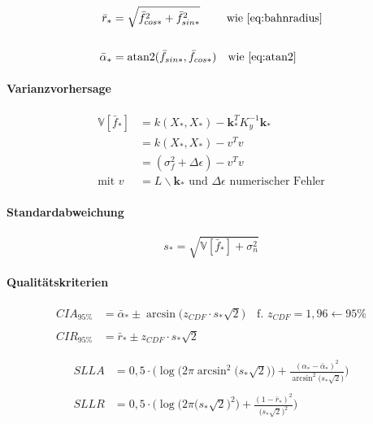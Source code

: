 \begin{align}\label{eq:predangrad}
	\bar{r}_* &= \sqrt{\bar{f}_{cos*}^2 + \bar{f}_{sin*}^2} \quad\quad\ \text{wie \autoref{eq:bahnradius}} \nonumber \\
	\\
	\bar{\alpha}_* &= \text{atan2}(\bar{f}_{sin*}, \bar{f}_{cos*}) \quad \text{wie \autoref{eq:atan2}} \nonumber
\end{align}



\paragraph*{Varianzvorhersage}


\begin{align}\label{eq:predvar}
	\mathbb{V}\left[ \bar{f}_* \right] &= k(X_*, X_*) - \mathbf{k}_*^T K_y^{-1} \mathbf{k}_* \nonumber \\
									   &= k(X_*, X_*) - v^T v \\
									   &= (\sigma_f^2 + \Delta\epsilon) - v^T v \nonumber \\
						 \text{mit } v &= L \backslash \mathbf{k}_* \text{ und } \Delta\epsilon \text{ numerischer Fehler} \nonumber
\end{align}


\paragraph*{Standardabweichung}


\begin{equation}\label{eq:predstd}
s_* = \sqrt{\mathbb{V}\left[ \bar{f}_* \right] + \sigma_n^2}
\end{equation}


\paragraph*{Qualitätskriterien}


\begin{align}\label{eq:predci}
	CIA_{95\%} &= \bar{\alpha}_* \pm \arcsin \big( z_{CDF} \cdot s_* \sqrt{2} \big) \quad \text{f. } z_{CDF} = 1,96 \leftarrow 95\% \nonumber \\
	\\
	CIR_{95\%} &= \bar{r}_* \pm z_{CDF} \cdot s_* \sqrt{2} \nonumber
\end{align}



\begin{align}\label{eq:predsll}
	SLLA &= 0,5 \cdot \bigg( \log \big( 2\pi \arcsin^2 \big( s_* \sqrt{2}) \big) + \frac{(\alpha_* - \bar{\alpha}_*)^2}{\arcsin^2 \big( s_* \sqrt{2} \big)}\bigg) \nonumber \\
	\\
	SLLR &= 0,5 \cdot \bigg( \log \big( 2\pi \big( s_* \sqrt{2} \big)^2 \big) + \frac{(1 - \bar{r}_*)^2}{\big( s_* \sqrt{2} \big)^2}\bigg) \nonumber
\end{align}


